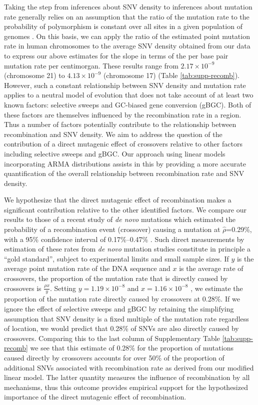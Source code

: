 Taking the step from inferences about SNV density to inferences about mutation rate generally relies on an assumption that the ratio of the mutation rate to the probability of polymorphism is constant over all sites in a given population of genomes \citep[cf.][]{Hodgkinson2009}. On this basis, we can apply the ratio of the estimated point mutation rate in human chromosomes \citep{Jnsson_Parental_2017} to the average SNV density obtained from our data to express our above estimates for the slope in terms of the per base pair mutation rate per centimorgan. These results range from $2.17\times10^{-9}$ (chromosome 21) to $4.13\times10^{-9}$ (chromosome 17) (Table \ref{tab:supp-recomb}). However, such a constant relationship between SNV density and mutation rate applies to a neutral model of evolution that does not take account of at least two known factors: selective sweeps and GC-biased gene conversion (gBGC). Both of these factors are themselves influenced by the recombination rate in a region. Thus a number of factors potentially contribute to the relationship between recombination and SNV density. We aim to address the question of the contribution of a direct mutagenic effect of crossovers relative to other factors including selective sweeps and gBGC. Our approach using linear models incorporating ARMA distributions assists in this by providing a more accurate quantification of the overall relationship between recombination rate and SNV density.

We hypothesize that the direct mutagenic effect of recombination makes a significant contribution relative to the other identified factors. We compare our results to those of a recent study of \textit{de novo} mutations which estimated the probability of a recombination event (crossover) causing a mutation at $\hat{\rho}$=0.29\%, with a 95\% confidence interval of 0.17\%–0.47\% \citep{Arbeithuber_Crossovers_2015}. Such direct measurements by estimation of these rates from \textit{de novo} mutation studies constitute in principle a ``gold standard'', subject to experimental limits and small sample sizes. If $y$ is the average point mutation rate of the DNA sequence and $x$ is the average rate of crossovers, the proportion of the mutation rate that is directly caused by crossovers is $\frac{\rho x}{y}$. Setting $y=1.19\times10^{-8}$ \citep{jonsson2017whole} and $x=1.16\times10^{-8}$ \citep{Kong_2010}, we estimate the proportion of the mutation rate directly caused by crossovers at 0.28\%. If we ignore the effect of selective sweeps and gBGC by retaining the simplifying assumption that SNV density is a fixed multiple of the mutation rate regardless of location, we would predict that 0.28\% of SNVs are also directly caused by crossovers.  Comparing this to the last column of Supplementary Table \ref{tab:supp-recomb} we see that this estimate of 0.28\% for the proportion of mutations caused directly by crossovers  accounts for over 50\% of the proportion of additional SNVs associated with recombination rate as derived from our modified linear model. The latter quantity measures the influence of recombination by all mechanisms, thus this outcome provides empirical support for the hypothesized importance of the direct mutagenic effect of recombination.
 
